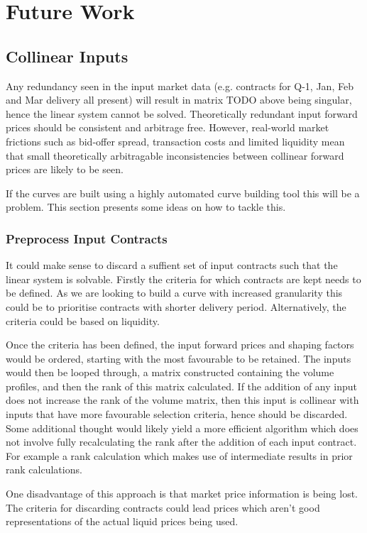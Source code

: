 \documentclass{article}
\begin{document}
\section{Future Work}
\subsection{Collinear Inputs}
Any redundancy seen in the input market data (e.g. contracts for Q-1, Jan, Feb and Mar delivery all present)
will result in matrix TODO above being singular, hence the linear system cannot be solved.
Theoretically redundant input forward prices should be consistent and arbitrage free.
However, real-world market frictions such as bid-offer spread, transaction costs and limited
liquidity mean that small theoretically arbitragable inconsistencies between collinear forward
prices are likely to be seen.

If the curves are built using a highly automated curve building tool this will be a problem.
This section presents some ideas on how to tackle this.

\subsubsection{Preprocess Input Contracts}
It could make sense to discard a suffient set of input contracts 
such that the linear system is solvable. Firstly the criteria for which contracts
are kept needs to be defined. As we are looking to build a curve with increased granularity
this could be to prioritise contracts with shorter delivery period. Alternatively, the
criteria could be based on liquidity.

Once the criteria has been defined, the input forward prices and shaping factors would
be ordered, starting with the most favourable to be retained. The inputs would then
be looped through, a matrix constructed containing the volume profiles, and then the rank
of this matrix calculated. If the addition of any input does not increase the rank of
the volume matrix, then this input is collinear with inputs that have more favourable 
selection criteria, hence should be discarded. Some additional thought would likely
yield a more efficient algorithm which does not involve fully recalculating the rank 
after the addition of each input contract. For example a rank calculation which makes
use of intermediate results in prior rank calculations.

\bigskip

One disadvantage of this approach is that market price information is being lost. The
criteria for discarding contracts could lead prices which aren't good
representations of the actual liquid prices being used.
\end{document}

